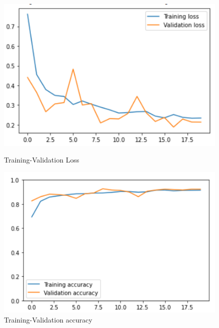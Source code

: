 \documentclass[11pt,a4paper]{article}
\theoremstyle{definition}
\begin{document}
\begin{figure}[H]
  \centering
  \begin{minipage}[b]{0.45\textwidth}
    \includegraphics[scale=0.75]{./images/resnet1loss}
	\caption{Training-Validation Loss}
  \end{minipage}
  \hfill
  \begin{minipage}[b]{0.45\textwidth}
    \includegraphics[scale=0.75]{./images/resnet1acc}
	\caption{Training-Validation accuracy}
  \end{minipage}
\end{figure}
\end{document}
